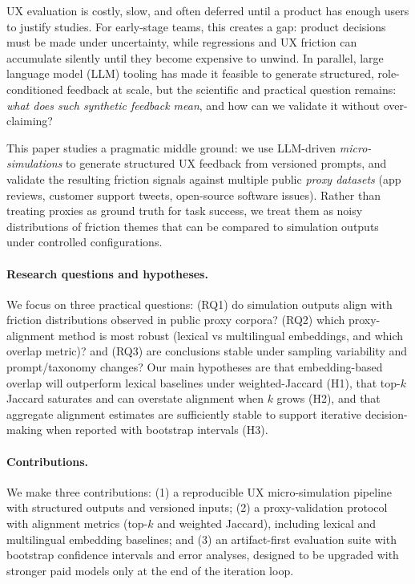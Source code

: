 UX evaluation is costly, slow, and often deferred until a product has enough users to justify studies.
For early-stage teams, this creates a gap: product decisions must be made under uncertainty,
while regressions and UX friction can accumulate silently until they become expensive to unwind.
In parallel, large language model (LLM) tooling has made it feasible to generate structured, role-conditioned feedback at scale,
but the scientific and practical question remains: \emph{what does such synthetic feedback mean}, and how can
we validate it without over-claiming?

This paper studies a pragmatic middle ground: we use LLM-driven \emph{micro-simulations} to generate
structured UX feedback from versioned prompts, and validate the resulting friction signals against
multiple public \emph{proxy datasets} (app reviews, customer support tweets, open-source software issues).
Rather than treating proxies as ground truth for task success, we treat them as noisy distributions of
friction themes that can be compared to simulation outputs under controlled configurations.

\paragraph{Research questions and hypotheses.}
We focus on three practical questions:
(RQ1) do simulation outputs align with friction distributions observed in public proxy corpora?
(RQ2) which proxy-alignment method is most robust (lexical vs multilingual embeddings, and which overlap metric)?
and (RQ3) are conclusions stable under sampling variability and prompt/taxonomy changes?
Our main hypotheses are that embedding-based overlap will outperform lexical baselines under weighted-Jaccard (H1),
that top-$k$ Jaccard saturates and can overstate alignment when $k$ grows (H2),
and that aggregate alignment estimates are sufficiently stable to support iterative decision-making when reported with bootstrap intervals (H3).

\paragraph{Contributions.}
We make three contributions:
(1) a reproducible UX micro-simulation pipeline with structured outputs and versioned inputs;
(2) a proxy-validation protocol with alignment metrics (top-$k$ and weighted Jaccard),
including lexical and multilingual embedding baselines; and
(3) an artifact-first evaluation suite with bootstrap confidence intervals and error analyses, designed
to be upgraded with stronger paid models only at the end of the iteration loop.

